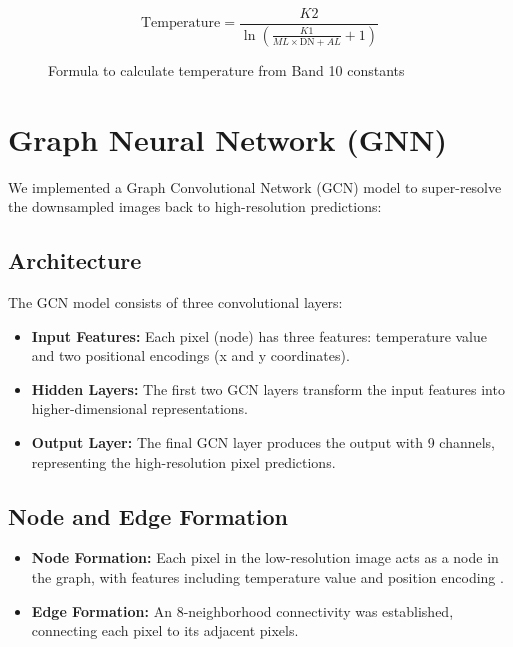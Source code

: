 \documentclass[runningheads,a4paper,11pt]{report}
\begin{document}
\begin{figure}[H]
    \centering
    \begin{equation}
    \text{Temperature} = \frac{K2}{\ln\left(\frac{K1}{ML \times \text{DN} + AL} + 1\right)} \end{equation}
    \caption{Formula to calculate temperature from Band 10 constants \cite{usgs2019}}
    \label{fig:tempFormula}
\end{figure}

\section{Graph Neural Network (GNN)}
We implemented a Graph Convolutional Network (GCN) model to super-resolve the downsampled images back to high-resolution predictions:

\subsection{Architecture}
The GCN model consists of three convolutional layers: 
\begin{itemize} 
    \item \textbf{Input Features:} Each pixel (node) has three features: temperature value and two positional encodings (x and y coordinates). 
    \item \textbf{Hidden Layers:} The first two GCN layers transform the input features into higher-dimensional representations. 
    \item \textbf{Output Layer:} The final GCN layer produces the output with 9 channels, representing the high-resolution pixel predictions. 
\end{itemize}

\subsection{Node and Edge Formation}
\begin{itemize}

    \item \textbf{Node Formation:} Each pixel in the low-resolution image acts as a node in the graph, with features including temperature value and position encoding
    . \item \textbf{Edge Formation:} An 8-neighborhood connectivity was established, connecting each pixel to its adjacent pixels.
    
\end{itemize}
\end{document}
